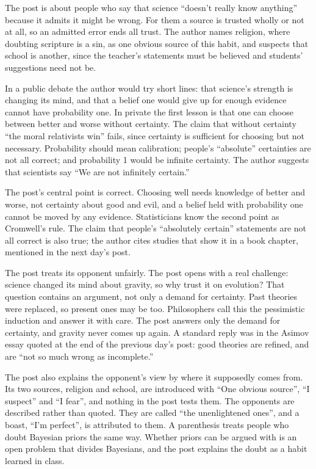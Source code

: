 \begin{afterword}
\summaryhead

The post is about people who say that science ``doesn't really know anything'' because it admits it might be wrong. For them a source is trusted wholly or not at all, so an admitted error ends all trust. The author names religion, where doubting scripture is a sin, as one obvious source of this habit, and suspects that school is another, since the teacher's statements must be believed and students' suggestions need not be.

In a public debate the author would try short lines: that science's strength is changing its mind, and that a belief one would give up for enough evidence cannot have probability one. In private the first lesson is that one can choose between better and worse without certainty. The claim that without certainty ``the moral relativists win'' fails, since certainty is sufficient for choosing but not necessary. Probability should mean calibration; people's ``absolute'' certainties are not all correct; and probability 1 would be infinite certainty. The author suggests that scientists say ``We are not infinitely certain.''

\responsehead

The post's central point is correct. Choosing well needs knowledge of better and worse, not certainty about good and evil, and a belief held with probability one cannot be moved by any evidence. Statisticians know the second point as Cromwell's rule. The claim that people's ``absolutely certain'' statements are not all correct is also true; the author cites studies that show it in a book chapter, mentioned in the next day's post.

The post treats its opponent unfairly. The post opens with a real challenge: science changed its mind about gravity, so why trust it on evolution? That question contains an argument, not only a demand for certainty. Past theories were replaced, so present ones may be too. Philosophers call this the pessimistic induction and answer it with care. The post answers only the demand for certainty, and gravity never comes up again. A standard reply was in the Asimov essay quoted at the end of the previous day's post: good theories are refined, and are ``not so much wrong as incomplete.''

The post also explains the opponent's view by where it supposedly comes from. Its two sources, religion and school, are introduced with ``One obvious source'', ``I suspect'' and ``I fear'', and nothing in the post tests them. The opponents are described rather than quoted. They are called ``the unenlightened ones'', and a boast, ``I'm perfect'', is attributed to them. A parenthesis treats people who doubt Bayesian priors the same way. Whether priors can be argued with is an open problem that divides Bayesians, and the post explains the doubt as a habit learned in class.


\end{afterword}
